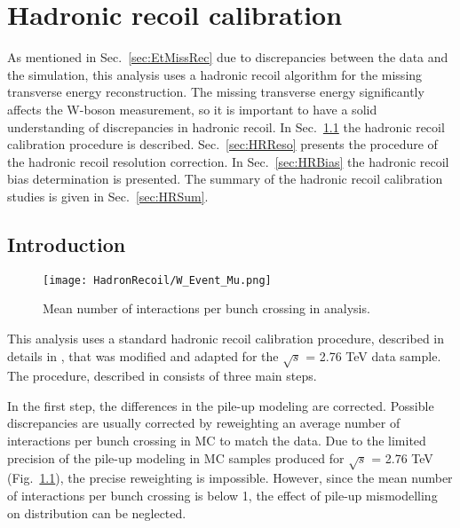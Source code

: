 \chapter{Hadronic recoil calibration}\label{sec:HadrCalib}
\minitoc

As mentioned in Sec.~\ref{sec:EtMissRec} due to discrepancies between the data and the simulation, this analysis uses a hadronic recoil algorithm for the missing transverse energy reconstruction. The missing transverse energy significantly affects the W-boson measurement, so it is important to have a solid understanding  of discrepancies in hadronic recoil.
In Sec.~\ref{sec:HRIntro} the hadronic recoil calibration procedure is described. Sec.~\ref{sec:HRReso} presents the procedure of the hadronic recoil resolution correction. In Sec.~\ref{sec:HRBias} the hadronic recoil bias determination is presented. The summary of the hadronic recoil calibration studies is given in Sec.~\ref{sec:HRSum}. 

\section{Introduction}\label{sec:HRIntro}

\begin{figure}[!bp]
\centering
\texttt{[image: HadronRecoil/W\_Event\_Mu.png]}
\caption{Mean number of interactions per bunch crossing in \wenu analysis.}
\label{HadrRecoil:mu}
\end{figure} 

This analysis uses a standard hadronic recoil calibration procedure, described in details in \cite{HRCorrections}, that was modified and adapted for the $\sqrt{s}$ = 2.76 TeV data sample.  The procedure, described in \cite{HRCorrections} consists of three main steps. 

In the first step, the differences in the pile-up modeling are corrected. Possible discrepancies are usually corrected by reweighting an average number of interactions per bunch crossing in MC to match the data.  Due to the limited precision of the pile-up modeling in MC samples produced for $\sqrt{s}$ = 2.76 TeV (Fig.~\ref{HadrRecoil:mu}), the precise reweighting is impossible. However, since the mean number of interactions per bunch crossing is below 1, the effect of pile-up mismodelling  on \etmiss distribution can be neglected.


